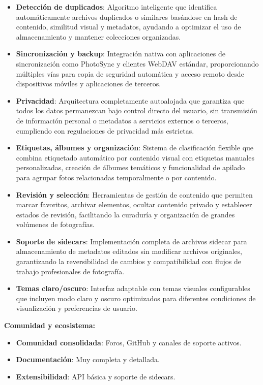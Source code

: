 \begin{itemize}
    \item \textbf{Detección de duplicados}: Algoritmo inteligente que identifica automáticamente archivos duplicados o similares basándose en hash de contenido, similitud visual y metadatos, ayudando a optimizar el uso de almacenamiento y mantener colecciones organizadas.
    \item \textbf{Sincronización y backup}: Integración nativa con aplicaciones de sincronización como PhotoSync y clientes WebDAV estándar, proporcionando múltiples vías para copia de seguridad automática y acceso remoto desde dispositivos móviles y aplicaciones de terceros.
    \item \textbf{Privacidad}: Arquitectura completamente autoalojada que garantiza que todos los datos permanezcan bajo control directo del usuario, sin transmisión de información personal o metadatos a servicios externos o terceros, cumpliendo con regulaciones de privacidad más estrictas.
    \item \textbf{Etiquetas, álbumes y organización}: Sistema de clasificación flexible que combina etiquetado automático por contenido visual con etiquetas manuales personalizadas, creación de álbumes temáticos y funcionalidad de apilado para agrupar fotos relacionadas temporalmente o por contenido.
    \item \textbf{Revisión y selección}: Herramientas de gestión de contenido que permiten marcar favoritos, archivar elementos, ocultar contenido privado y establecer estados de revisión, facilitando la curaduría y organización de grandes volúmenes de fotografías.
    \item \textbf{Soporte de sidecars}: Implementación completa de archivos sidecar para almacenamiento de metadatos editados sin modificar archivos originales, garantizando la reversibilidad de cambios y compatibilidad con flujos de trabajo profesionales de fotografía.
    \item \textbf{Temas claro/oscuro}: Interfaz adaptable con temas visuales configurables que incluyen modo claro y oscuro optimizados para diferentes condiciones de visualización y preferencias de usuario.
\end{itemize}

\textbf{Comunidad y ecosistema:}
\begin{itemize}
    \item \textbf{Comunidad consolidada}: Foros, GitHub y canales de soporte activos.
    \item \textbf{Documentación}: Muy completa y detallada.
    \item \textbf{Extensibilidad}: API básica y soporte de sidecars.
\end{itemize}

